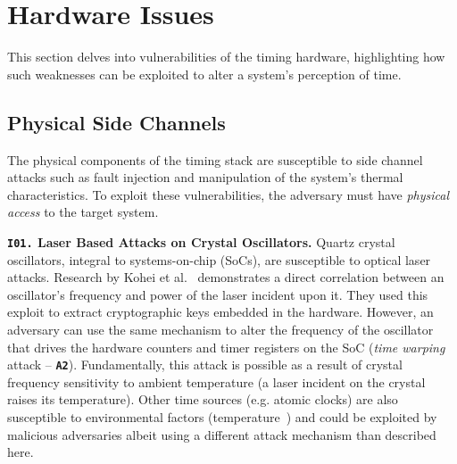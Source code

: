 \section{Hardware Issues} \label{sec:hardware}
This section delves into vulnerabilities of the timing hardware, highlighting how such weaknesses can be exploited to alter a system's perception of time.

\subsection{Physical Side Channels} 
The physical components of the timing stack are susceptible to side channel attacks such as fault injection and manipulation of the system's thermal characteristics. To exploit these vulnerabilities, the adversary must have \textit{physical access} to the target system.

\noindent\textbf{\texttt{I01.} Laser Based Attacks on Crystal Oscillators.} Quartz crystal oscillators, integral to systems-on-chip (SoCs), are susceptible to optical laser attacks. Research by Kohei et al.~\cite{redshift} demonstrates a direct correlation between an oscillator's frequency and power of the laser incident upon it. 
They used this exploit to extract cryptographic keys embedded in the hardware. However, an adversary can use the same mechanism to alter the frequency of the oscillator that drives the hardware counters and timer registers on the SoC (\textit{time warping} attack --  \textbf{\texttt{A2}}). Fundamentally, this attack is possible as a result of crystal frequency sensitivity to ambient temperature (a laser incident on the crystal raises its temperature). Other time sources (e.g. atomic clocks) are also susceptible to environmental factors (temperature~\cite{nasa-atomic-clock}) and could be exploited by malicious adversaries albeit using a different attack mechanism than described here.

